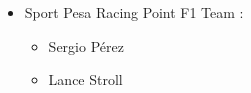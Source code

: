 \documentclass{report}
\begin{document}
\begin{itemize}
\begin{itemize}
\begin{figure}[!h]
\begin{floatrow}
            \end{floatrow}
            \end{figure}
        \end{itemize}
    \item Sport Pesa Racing Point F1 Team :
        \begin{itemize}
            \item Sergio Pérez
            \item Lance Stroll
            \begin{figure}[!h]
            \begin{floatrow}

\end{floatrow}
\end{figure}
\end{itemize}
\end{itemize}
\end{document}

